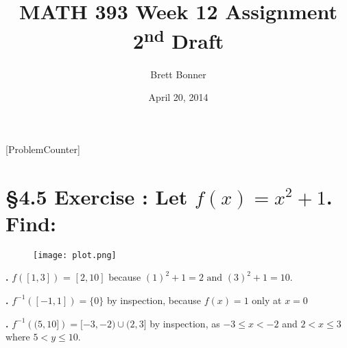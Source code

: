 \documentclass[a4paper,11pt]{article}
\begin{document}
\newtheorem*{theorem1}{Theorem}
\newtheorem*{theorem2}{Theorem}
\newtheorem*{theorem3}{Theorem}
\newtheorem*{theorem4}{Theorem}
\newtheorem*{theorem5}{Theorem}
\newtheorem*{theorem6}{Theorem}
\newtheorem*{theorem7}{Theorem}
\newtheorem*{theorem8}{Theorem}
\newtheorem*{theorem9}{True/False?}
\title{MATH 393 Week 12 Assignment 2\textsuperscript{nd} Draft}
\author{Brett Bonner}
\date{April 20, 2014}
\maketitle
\doublespacing
{}
[ProblemCounter]
\setcounter{ProblemCounter}{2}
\section*{\S 4.5 Exercise : Let \(f{(x)}=x^{2} + 1\). Find:}
\begin{figure}[htbp!]
\centering
\texttt{[image: plot.png]}
\label{fig:plot}
\end{figure}
\setcounter{SubsectionCounter}{1}
\noindent\textbf{.}
\(f{([1,3])}\) = \([2,10]\) because \({(1)}^2 + 1 = 2 \text{ and } {(3)}^2 + 1 = 10.\)\\
\addtocounter{SubsectionCounter}{2}
\textbf{.}
\(f^{-1}{([-1,1])} = \{0\}\) by inspection, because \(f{(x)}=1\) only at \(x=0\)\\
\addtocounter{SubsectionCounter}{2}
\textbf{.}
\(f^{-1}{({(5,{10]}})} = {[-3,-2)} \cup {(2,3]}\) by inspection, as \(-3 \leq x < -2 \) and \(2 < x \leq 3\) where \(5 < y \leq 10 
\).
\newpage
\setcounter{ProblemCounter}{7}
\end{document}
